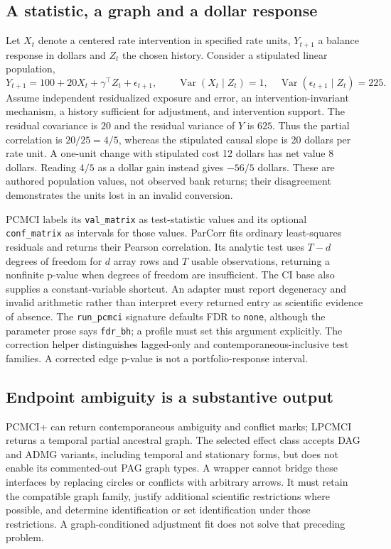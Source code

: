 \subsection{A statistic, a graph and a dollar response}
\label{exec23:tigramite-statistic}
Let $X_t$ denote a centered rate intervention in specified rate units, $Y_{t+1}$ a balance response in dollars and $Z_t$ the chosen history. Consider a stipulated linear population,
\begin{equation}
 Y_{t+1}=100+20X_t+\gamma^\top Z_t+\epsilon_{t+1},\qquad
 \operatorname{Var}(X_t\mid Z_t)=1,\quad
 \operatorname{Var}(\epsilon_{t+1}\mid Z_t)=225.
 \label{exec23:tigramite-dollar}
\end{equation}
Assume independent residualized exposure and error, an intervention-invariant mechanism, a history sufficient for adjustment, and intervention support. The residual covariance is $20$ and the residual variance of $Y$ is $625$. Thus the partial correlation is $20/25=4/5$, whereas the stipulated causal slope is 20 dollars per rate unit. A one-unit change with stipulated cost 12 dollars has net value 8 dollars. Reading $4/5$ as a dollar gain instead gives $-56/5$ dollars. These are authored population values, not observed bank returns; their disagreement demonstrates the units lost in an invalid conversion. \cite{exec23_tigramite_reference}

PCMCI labels its \texttt{val\_matrix} as test-statistic values and its optional \texttt{conf\_matrix} as intervals for those values. ParCorr fits ordinary least-squares residuals and returns their Pearson correlation. Its analytic test uses $T-d$ degrees of freedom for $d$ array rows and $T$ usable observations, returning a nonfinite p-value when degrees of freedom are insufficient. The CI base also supplies a constant-variable shortcut. An adapter must report degeneracy and invalid arithmetic rather than interpret every returned entry as scientific evidence of absence. The \texttt{run\_pcmci} signature defaults FDR to \texttt{none}, although the parameter prose says \texttt{fdr\_bh}; a profile must set this argument explicitly. The correction helper distinguishes lagged-only and contemporaneous-inclusive test families. A corrected edge p-value is not a portfolio-response interval. \cite{exec23_tigramite_reuse_source}

\subsection{Endpoint ambiguity is a substantive output}
\label{exec23:tigramite-graph}
PCMCI+ can return contemporaneous ambiguity and conflict marks; LPCMCI returns a temporal partial ancestral graph. The selected effect class accepts DAG and ADMG variants, including temporal and stationary forms, but does not enable its commented-out PAG graph types. A wrapper cannot bridge these interfaces by replacing circles or conflicts with arbitrary arrows. It must retain the compatible graph family, justify additional scientific restrictions where possible, and determine identification or set identification under those restrictions. A graph-conditioned adjustment fit does not solve that preceding problem. \cite{exec23_tigramite_reuse_source}

